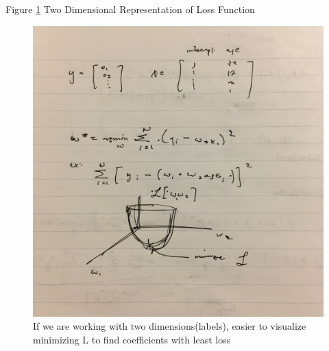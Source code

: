 \pagebreak

Figure \ref{fig:example_figure6} Two Dimensional Representation of Loss Function

\begin{figure}[ht]
  \begin{center}
    \includegraphics[width=.9\textwidth]{figures/FullSizeRender.jpg}
    \caption{
      If we are working with two dimensions(labels), easier to visualize minimizing L to find
      coefficients with least loss}
    \label{fig:example_figure6}
  \end{center}
\end{figure}

\pagebreak

